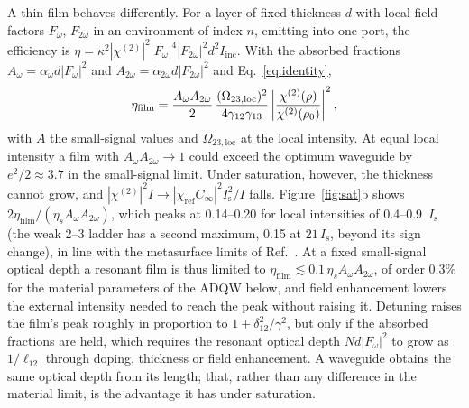 \documentclass[11pt]{article}
\newcommand{\chitwo}{\chi^{(2)}}
\newcommand{\aw}{\alpha_{\omega}}
\newcommand{\aww}{\alpha_{2\omega}}
\newcommand{\Is}{I_\mathrm{s}}
\let\hbar\relax\DeclareRobustCommand{\hbar}{{\mathchar'26\mkern-9mu h}}
\begin{document}
A thin film behaves differently. For a layer of fixed thickness $d$ with local-field factors $F_\omega$, $F_{2\omega}$ in an environment of index $n$, emitting into one port, the efficiency is $\eta=\kappa^2|\chitwo|^2|F_\omega|^4|F_{2\omega}|^2d^2I_\mathrm{inc}$. With the absorbed fractions $A_\omega=\aw d|F_\omega|^2$ and $A_{2\omega}=\aww d|F_{2\omega}|^2$ and Eq.~\eqref{eq:identity},
\begin{equation}
\eta_\mathrm{film}=\frac{A_\omega A_{2\omega}}{2}\,\frac{(\hbar\Omega_{23,\mathrm{loc}})^2}{4\gamma_{12}\gamma_{13}}\left|\frac{\chitwo(\rho)}{\chitwo(\rho_0)}\right|^2,\label{eq:film}
\end{equation}
with $A$ the small-signal values and $\Omega_{23,\mathrm{loc}}$ at the local intensity. At equal local intensity a film with $A_\omega A_{2\omega}\to1$ could exceed the optimum waveguide by $e^2/2\approx3.7$ in the small-signal limit. Under saturation, however, the thickness cannot grow, and $|\chitwo|^2I\to|\chi_\mathrm{ref}C_\infty|^2\Is^2/I$ falls. Figure~\ref{fig:sat}b shows $2\eta_\mathrm{film}/(\eta_sA_\omega A_{2\omega})$, which peaks at 0.14--0.20 for local intensities of 0.4--0.9~$\Is$ (the weak 2--3 ladder has a second maximum, 0.15 at $21\,\Is$, beyond its sign change), in line with the metasurface limits of Ref.~\cite{GomezDiaz2015}. At a fixed small-signal optical depth a resonant film is thus limited to $\eta_\mathrm{film}\lesssim0.1\,\eta_sA_\omega A_{2\omega}$, of order 0.3\% for the material parameters of the ADQW below, and field enhancement lowers the external intensity needed to reach the peak without raising it. Detuning raises the film's peak roughly in proportion to $1+\delta_{12}^2/\gamma^2$, but only if the absorbed fractions are held, which requires the resonant optical depth $N d|F_\omega|^2$ to grow as $1/\ell_{12}$ through doping, thickness or field enhancement. A waveguide obtains the same optical depth from its length; that, rather than any difference in the material limit, is the advantage it has under saturation.
\end{document}
